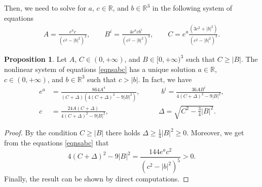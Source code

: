 \documentclass[reqno]{amsart}
\theoremstyle{definition}
\newtheorem{proposition}[theorem]{Proposition}
\numberwithin{equation}{section}
\numberwithin{theorem}{section}
\begin{document}
Then, we need to solve for \(a\), \(c\in \mathbb{R}\), and \(b\in \mathbb{R}^3\) in the following system of equations
\begin{align}
    A=\frac{e^a c}{(c^2-|b|^2)^2},\qquad B^i=\frac{4e^acb^i}{(c^2-|b|^2)^3},\qquad C=e^a\frac{(3c^2+|b|^2)}{(c^2-|b|^2)^3}.\label{eqnsabc}
\end{align}

\begin{proposition}
    Let \(A\), \(C\in (0,+\infty)\), and \(B\in [0,+\infty)^3\) such that \(C\geq |B|\). The nonlinear system of equations \eqref{eqnsabc} has a unique solution \(a\in \mathbb{R}\), \(c\in (0,+\infty)\), and \(b\in \mathbb{R}^3\) such that \(c>|b|\). In fact, we have
    \begin{align*}
        e^a&=\frac{864A^4}{(C+\Delta)(4(C+\Delta)^2-9|B|^2)},\quad\qquad b^i=\frac{36AB^i}{4(C+\Delta)^2-9|B|^2},\\
        c&=\frac{24A(C+\Delta)}{4(C+\Delta)^2-9|B|^2},\qquad \qquad \qquad \quad\Delta=\sqrt{C^2-\frac{3}{4}|B|^2}.
    \end{align*}
\end{proposition}

\begin{proof}
    By the condition \(C\geq |B|\) there holds \(\Delta\geq \frac{1}{4}|B|^2\geq 0\). Moreover, we get from the equations \eqref{eqnsabc} that \[4(C+\Delta)^2-9|B|^2=\frac{144e^ac^2}{(c^2-|b|^2)^5}>0.\] Finally, the result can be shown by direct computations.
\end{proof}
\end{document}
